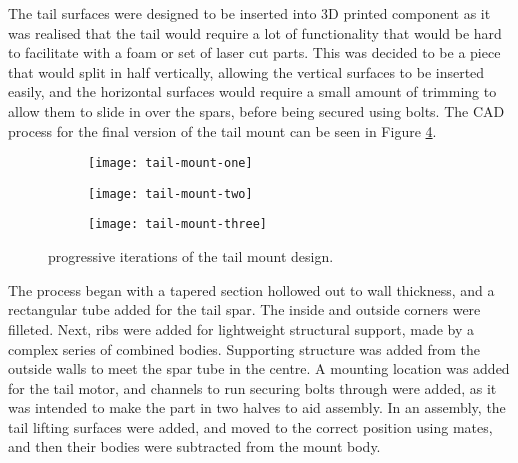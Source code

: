 \documentclass[../../main.tex]{subfiles}
\begin{document}
The tail surfaces were designed to be inserted into 3D printed component as it was realised that the tail would require a lot of functionality that would be hard to facilitate with a foam or set of laser cut parts.
This was decided to be a piece that would split in half vertically, allowing the vertical surfaces to be inserted easily, and the horizontal surfaces would require a small amount of trimming to allow them to slide in over the spars, before being secured using bolts.
The CAD process for the final version of the tail mount can be seen in Figure \ref{fig:tail-mount-progression}.


\begin{figure}[H]
    \centering
    \begin{subfigure}[b]{0.32\columnwidth}
        \centering
        \texttt{[image: tail-mount-one]}
        \caption{}
        \label{fig:tail-mount-progression:initial}
    \end{subfigure}
    \hfill
    \begin{subfigure}[b]{0.32\columnwidth}
        \centering
        \texttt{[image: tail-mount-two]}
        \caption{}
        \label{fig:tail-mount-progression:revised}
    \end{subfigure}
    \hfill
    \begin{subfigure}[b]{0.32\columnwidth}
        \centering
        \texttt{[image: tail-mount-three]}
        \caption{}
        \label{fig:tail-mount-progression:final}
    \end{subfigure}
    
    \caption{progressive iterations of the tail mount design.}
    \label{fig:tail-mount-progression}
\end{figure} 

The process began with a tapered section hollowed out to  wall thickness, and a rectangular tube added for the tail spar.
The inside and outside corners were filleted. 
Next, ribs were added for lightweight structural support, made by a complex series of combined bodies.
Supporting structure was added from the outside walls to meet the spar tube in the centre.
A mounting location was added for the tail motor, and channels to run securing bolts through were added, as it was intended to make the part in two halves to aid assembly.  
In an assembly, the tail lifting surfaces were added, and moved to the correct position using mates, and then their bodies were subtracted from the mount body. 
\end{document}
